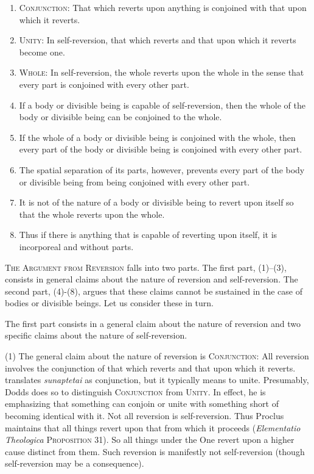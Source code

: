 \begin{enumerate}[(1)]
	\item \textsc{Conjunction}: That which reverts upon anything is conjoined with that upon which it reverts.
	\item \textsc{Unity}: In self-reversion, that which reverts and that upon which it reverts become one.
	\item \textsc{Whole}: In self-reversion, the whole reverts upon the whole in the sense that every part is conjoined with every other part.
	\item If a body or divisible being is capable of self-reversion, then the whole of the body or divisible being can be conjoined to the whole.
	\item If the whole of a body or divisible being is conjoined with the whole, then every part of the body or divisible being is conjoined with every other part.
	\item The spatial separation of its parts, however, prevents every part of the body or divisible being from being conjoined with every other part.
	\item It is not of the nature of a body or divisible being to revert upon itself so that the whole reverts upon the whole.
	\item Thus if there is anything that is capable of reverting upon itself, it is incorporeal and without parts.
\end{enumerate}
\textsc{The Argument from Reversion} falls into two parts. The first part, (1)–(3), consists in general claims about the nature of reversion and self-reversion. The second part, (4)-(8), argues that these claims cannot be sustained in the case of bodies or divisible beings. Let us consider these in turn.

The first part consists in a general claim about the nature of reversion and two specific claims about the nature of self-reversion. 

(1) The general claim about the nature of reversion is \textsc{Conjunction}: All reversion involves the conjunction of that which reverts and that upon which it reverts. \citet[19]{Dodds:1963ul} translates \emph{sunaptetai} as conjunction, but it typically means to unite. Presumably, Dodds does so to distinguish \textsc{Conjunction} from \textsc{Unity}. In effect, he is emphasizing that something can conjoin or unite with something short of becoming identical with it. Not all reversion is self-reversion. Thus Proclus maintains that all things revert upon that from which it proceeds (\emph{Elementatio Theologica} \textsc{Proposition} 31). So all things under the One revert upon a higher cause distinct from them. Such reversion is manifestly not self-reversion (though self-reversion may be a consequence).

